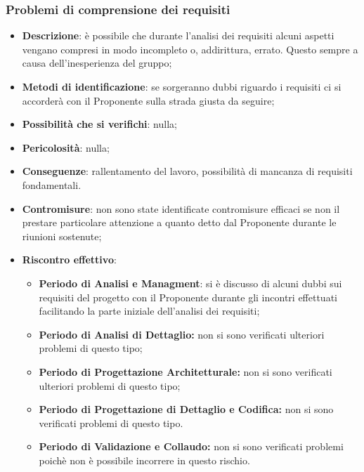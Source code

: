 		\subsubsection{Problemi di comprensione dei requisiti}
		\begin{itemize}
			\item \textbf{Descrizione}: è possibile che durante l'analisi dei requisiti alcuni aspetti vengano compresi in modo incompleto o, addirittura, errato. Questo sempre a causa dell'inesperienza del gruppo;
			\item \textbf{Metodi di identificazione}: se sorgeranno dubbi riguardo i requisiti ci si accorderà con il Proponente sulla strada giusta da seguire;
			\item \textbf{Possibilità che si verifichi}: nulla;
			\item \textbf{Pericolosità}: nulla;
			\item \textbf{Conseguenze}: rallentamento del lavoro, possibilità di mancanza di requisiti fondamentali.
			\item \textbf{Contromisure}: non sono state identificate contromisure efficaci se non il prestare particolare attenzione a quanto detto dal Proponente durante le riunioni sostenute;
			\item \textbf{Riscontro effettivo}:
			\begin{itemize}
				\item \textbf{Periodo di Analisi e Managment}: si è discusso di alcuni dubbi sui requisiti del progetto con il Proponente durante gli incontri effettuati facilitando la parte iniziale dell'analisi dei requisiti;
				\item \textbf{Periodo di Analisi di Dettaglio:} non si sono verificati ulteriori problemi di questo tipo;
				\item \textbf{Periodo di Progettazione Architetturale:} non si sono verificati ulteriori problemi di questo tipo;
            \item \textbf{Periodo di Progettazione di Dettaglio e Codifica:} non si sono verificati problemi di questo tipo.
            \item \textbf{Periodo di Validazione e Collaudo:} non si sono verificati problemi poichè non è possibile incorrere in questo rischio.
			\end{itemize}
		\end{itemize}

